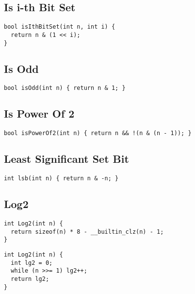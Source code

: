 \documentclass[twoside]{article}
\begin{document}
\begin{multicols*}{2}
\subsectionfont{\large\bfseries\sffamily\underline}
\subsection*{Is i-th Bit Set}
\begin{verbatim}
bool isIthBitSet(int n, int i) {
  return n & (1 << i);
}
\end{verbatim}

\subsectionfont{\large\bfseries\sffamily\underline}
\subsection*{Is Odd}
\begin{verbatim}
bool isOdd(int n) { return n & 1; }
\end{verbatim}

\subsectionfont{\large\bfseries\sffamily\underline}
\subsection*{Is Power Of 2}
\begin{verbatim}
bool isPowerOf2(int n) { return n && !(n & (n - 1)); }
\end{verbatim}

\subsectionfont{\large\bfseries\sffamily\underline}
\subsection*{Least Significant Set Bit}
\begin{verbatim}
int lsb(int n) { return n & -n; }
\end{verbatim}

\subsectionfont{\large\bfseries\sffamily\underline}
\subsection*{Log2}
\begin{verbatim}
int Log2(int n) {
  return sizeof(n) * 8 - __builtin_clz(n) - 1;
}
\end{verbatim}
\vspace{-12pt}
\begin{verbatim}
int Log2(int n) {
  int lg2 = 0;
  while (n >>= 1) lg2++;
  return lg2;
}
\end{verbatim}


\end{multicols*}
\end{document}
